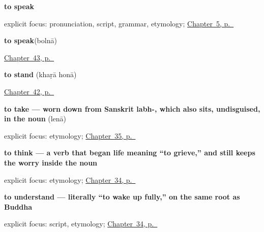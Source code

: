 \noindent\begin{minipage}[t]{\linewidth}
\raggedright
\textbf{to speak}\enspace\emph{}\par
\footnotesize explicit focus: pronunciation, script, grammar, etymology; \hyperref[ch:first-verbs]{Chapter~5, p.~\pageref*{ch:first-verbs}}
\end{minipage}\par\smallskip

\noindent\begin{minipage}[t]{\linewidth}
\raggedright
\textbf{to speak}\enspace\emph{}\enspace(bolnā)\par
\footnotesize \hyperref[ch:hi-see-say]{Chapter~43, p.~\pageref*{ch:hi-see-say}}
\end{minipage}\par\smallskip

\noindent\begin{minipage}[t]{\linewidth}
\raggedright
\textbf{to stand}\enspace\emph{ }\enspace(khaṛā honā)\par
\footnotesize \hyperref[ch:hi-more-verbs]{Chapter~42, p.~\pageref*{ch:hi-more-verbs}}
\end{minipage}\par\smallskip

\noindent\begin{minipage}[t]{\linewidth}
\raggedright
\textbf{to take — worn down from Sanskrit labh-, which also sits, undisguised, in the noun }\enspace\emph{}\enspace(lenā)\par
\footnotesize explicit focus: etymology; \hyperref[ch:hi-pasand]{Chapter~35, p.~\pageref*{ch:hi-pasand}}
\end{minipage}\par\smallskip

\noindent\begin{minipage}[t]{\linewidth}
\raggedright
\textbf{to think — a verb that began life meaning \textquotedblleft{}to grieve,\textquotedblright{} and still keeps the worry inside the noun }\enspace\emph{}\par
\footnotesize explicit focus: etymology; \hyperref[ch:hi-verbs-of-the-mind]{Chapter~34, p.~\pageref*{ch:hi-verbs-of-the-mind}}
\end{minipage}\par\smallskip

\noindent\begin{minipage}[t]{\linewidth}
\raggedright
\textbf{to understand — literally \textquotedblleft{}to wake up fully,\textquotedblright{} on the same root as Buddha}\enspace\emph{}\par
\footnotesize explicit focus: script, etymology; \hyperref[ch:hi-verbs-of-the-mind]{Chapter~34, p.~\pageref*{ch:hi-verbs-of-the-mind}}
\end{minipage}\par\smallskip

